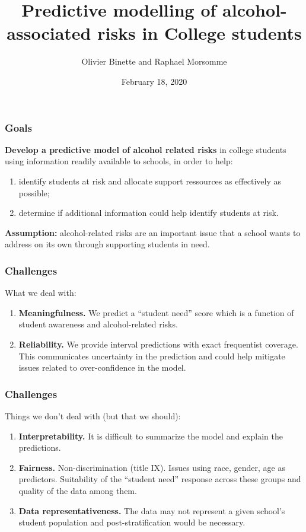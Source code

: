 \documentclass{beamer}
\title{Predictive modelling of alcohol-associated risks in College students}
\author{Olivier Binette and Raphael Morsomme}
\date{February 18, 2020}
\begin{document}
\frame{\titlepage}

\begin{frame} \frametitle{Goals}

\textbf{Develop a predictive model of alcohol related risks} in college students using information readily available to schools, in order to help:

\begin{enumerate}
  \item identify students at risk and allocate support ressources as effectively as possible;
  \item determine if additional information could help identify students at risk.
\end{enumerate}

\textbf{Assumption:} alcohol-related risks are an important issue that a school wants to address on its own through supporting students in need.
  
\end{frame}


\begin{frame} \frametitle{Challenges}

What we deal with:

\begin{enumerate}
  \item \textbf{Meaningfulness.} We predict a ``student need'' score which is a function of student awareness and alcohol-related risks.
  \item \textbf{Reliability.} We provide interval predictions with exact frequentist coverage. This communicates uncertainty in the prediction and could help mitigate issues related to over-confidence in the model.
\end{enumerate}

\end{frame}

\begin{frame} \frametitle{Challenges}

Things we don't deal with (but that we should):

\begin{enumerate}
  \item \textbf{Interpretability.} It is difficult to summarize the model and explain the predictions.
  \item \textbf{Fairness.} Non-discrimination (title IX). Issues using race, gender, age as predictors. Suitability of the ``student need'' response across these groups and quality of the data among them.
  \item \textbf{Data representativeness.} The data may not represent a given school's student population and post-stratification would be necessary.
\end{enumerate}

\end{frame}
\end{document}

